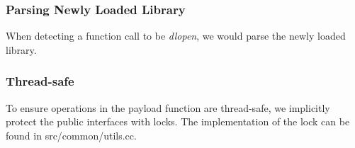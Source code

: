 \subsubsection{Parsing Newly Loaded Library}

When detecting a function call to be {\em dlopen}, we would parse the newly
loaded library.

\subsubsection{Thread-safe}

To ensure operations in the payload function are thread-safe, we implicitly
protect the public interfaces with locks. The implementation of the lock can be
found in src/common/utils.cc.

